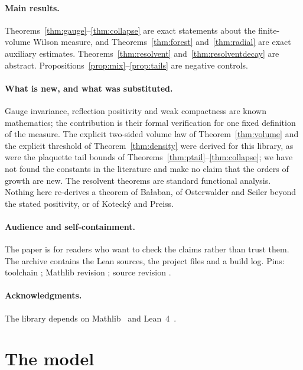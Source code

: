 \documentclass[11pt]{article}
\numberwithin{equation}{subsection}
\theoremstyle{plain}
\theoremstyle{definition}
\begin{document}
\paragraph{Main results.} Theorems~\ref{thm:gauge}--\ref{thm:collapse} are exact statements about
the finite-volume Wilson measure, and Theorems~\ref{thm:forest} and~\ref{thm:radial} are exact
auxiliary estimates. Theorems~\ref{thm:resolvent} and~\ref{thm:resolventdecay}
are abstract. Propositions~\ref{prop:mix}--\ref{prop:tails} are negative controls.

\paragraph{What is new, and what was substituted.} Gauge invariance, reflection positivity and
weak compactness are known mathematics; the contribution is their formal verification for one
fixed definition of the measure. The explicit two-sided volume law of
Theorem~\ref{thm:volume} and the explicit threshold of Theorem~\ref{thm:density} were derived
for this library, as were the plaquette tail bounds of
Theorems~\ref{thm:ptail}--\ref{thm:collapse}; we have not found the constants in the literature
and make no claim that the orders of growth are new. The resolvent theorems are standard functional analysis. Nothing
here re-derives a theorem of Ba\l{}aban, of Osterwalder and Seiler beyond the stated
positivity, or of Koteck\'y and Preiss.

\paragraph{Audience and self-containment.} The paper is for readers who want to check the
claims rather than trust them. The archive contains the Lean sources, the project files and a
build log. Pins: toolchain \texttt{\pkgtoolchain}; Mathlib revision \pkgmathlibb; source revision \pkgcommitb.

\paragraph{Acknowledgments.} The library depends on Mathlib~\cite{Mathlib} and
Lean~4~\cite{Lean4}.

\section{The model}\label{sec:model}
\end{document}

